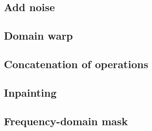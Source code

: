 \subsection{Add noise}

\subsection{Domain warp}

\subsection{Concatenation of operations}

\subsection{Inpainting}

\subsection{Frequency-domain mask}



